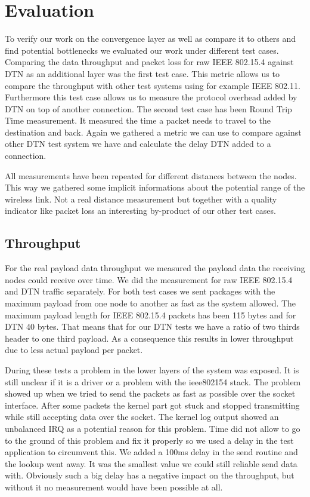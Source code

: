 \chapter{Evaluation}
To verify our work on the convergence layer as well as compare it to others and
find potential bottlenecks we evaluated our work under different test cases.
Comparing the data throughput and packet loss for raw IEEE 802.15.4 against DTN
as an additional layer was the first test case. This metric allows us to compare
the throughput with other test systems using for example IEEE 802.11.
Furthermore this test case allows us to measure the protocol overhead added by
DTN on top of another connection. The second test case has been Round Trip Time
measurement. It measured the time a packet needs to travel to the destination
and back. Again we gathered a metric we can use to compare against other DTN
test system we have and calculate the delay DTN added to a connection.

All measurements have been repeated for different distances between the nodes.
This way we gathered some implicit informations about the potential range of the
wireless link. Not a real distance measurement but together with a quality
indicator like packet loss an interesting by-product of our other test cases.

\section{Throughput}
For the real payload data throughput we measured the payload data the receiving
nodes could receive over time. We did the measurement for raw IEEE 802.15.4 and
DTN traffic separately. For both test cases we sent packages with the maximum
payload from one node to another as fast as the system allowed. The maximum
payload length for IEEE 802.15.4 packets has been 115 bytes and for DTN 40 bytes.
That means that for our DTN tests we have a ratio of two thirds header to one
third payload. As a consequence this results in lower throughput due to less
actual payload per packet.

During these tests a problem in the lower layers of the system was exposed. It is
still unclear if it is a driver or a problem with the ieee802154 stack. The
problem showed up when we tried to send the packets as fast as possible over the
socket interface. After some packets the kernel part got stuck and stopped
transmitting while still accepting data over the socket. The kernel log output
showed an unbalanced IRQ as a potential reason for this problem. Time did not allow
to go to the ground of this problem and fix it properly so we used a delay
in the test application to circumvent this. We added a 100ms delay in the send
routine and the lookup went away. It was the smallest value we could still
reliable send data with. Obviously such a big delay has a negative impact on the
throughput, but without it no measurement would have been possible at all.

